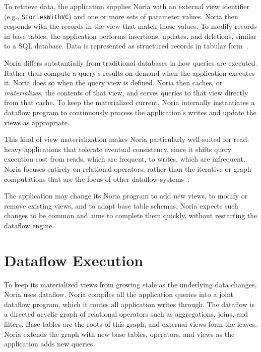 To retrieve data, the application supplies Noria with an external view
identifier (e.g., \texttt{StoriesWithVC}) and one or more sets of parameter
values. Noria then responds with the records in the view that match those
values. To modify records in base tables, the application performs insertions,
updates, and deletions, similar to a SQL database. Data is represented as
structured records in tabular form~\cite{spanner, bigtable}.

Noria differs substantially from traditional databases in how queries are
executed. Rather than compute a query's results on demand when the
application executes it, Noria does so when the query view is defined.
Noria then caches, or \emph{materializes}, the contents of that view, and serves
queries to that view directly from that cache. To keep the materialized current,
Noria internally instantiates a dataflow program to continuously process the
application's writes and update the views as appropriate.

This kind of view materialization makes Noria particularly well-suited for
read-heavy applications that tolerate eventual consistency, since it shifts
query execution cost from reads, which are frequent, to writes, which are
infrequent. Noria focuses entirely on relational operators, rather than the
iterative or graph computations that are the focus of other dataflow
systems~\cite{naiad, differential-dataflow}.

The application may change its Noria program to add new views, to modify or
remove existing views, and to adapt base table schemas. Noria expects such
changes to be common and aims to complete them quickly, without restarting the
dataflow engine.

\section{Dataflow Execution}

To keep its materialized views from growing stale as the underlying data
changes, Noria uses dataflow. Noria compiles all the application queries into a
joint dataflow program, which it routes all application writes through. The
dataflow is a directed acyclic graph of relational operators such as
aggregations, joins, and filters. Base tables are the roots of this graph, and
external views form the leaves. Noria extends the graph with new base tables,
operators, and views as the application adds new queries.

